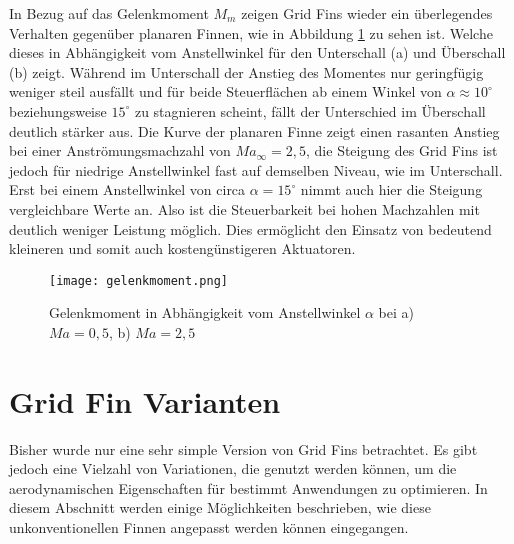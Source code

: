 In Bezug auf das Gelenkmoment $M_m$ zeigen Grid Fins wieder ein überlegendes Verhalten gegenüber planaren Finnen, wie in Abbildung \ref{abb_Mm-AoA} zu sehen ist. Welche dieses in Abhängigkeit vom Anstellwinkel für den Unterschall (a) und Überschall (b) zeigt. Während im Unterschall der Anstieg des Momentes nur geringfügig weniger steil ausfällt und für beide Steuerflächen ab einem Winkel von $\alpha \approx 10^\circ$ beziehungsweise $15^\circ$ zu stagnieren scheint, fällt der Unterschied im Überschall deutlich stärker aus. Die Kurve der planaren Finne zeigt einen rasanten Anstieg bei einer Anströmungsmachzahl von $Ma_\infty = 2,5$, die Steigung des Grid Fins ist jedoch für niedrige Anstellwinkel fast auf demselben Niveau, wie im Unterschall. Erst bei einem Anstellwinkel von circa $\alpha = 15^\circ$ nimmt auch hier die Steigung vergleichbare Werte an. Also ist die Steuerbarkeit bei hohen Machzahlen mit deutlich weniger Leistung möglich. Dies ermöglicht den Einsatz von bedeutend kleineren und somit auch kostengünstigeren Aktuatoren. 
\begin{figure}[h]
	\centering
	\texttt{[image: gelenkmoment.png]}
	\begin{flushright}
	\end{flushright}
	\caption{Gelenkmoment in Abhängigkeit vom Anstellwinkel $\alpha$ bei a) \ensuremath{Ma=0,5}, b) $Ma=2,5$}
	\label{abb_Mm-AoA}
\end{figure}
\newpage
\section{Grid Fin Varianten}
Bisher wurde nur eine sehr simple Version von Grid Fins betrachtet. Es gibt jedoch eine Vielzahl von Variationen, die genutzt werden können, um die aerodynamischen Eigenschaften für bestimmt Anwendungen zu optimieren. In diesem Abschnitt werden einige Möglichkeiten beschrieben, wie diese unkonventionellen Finnen angepasst werden können eingegangen.
